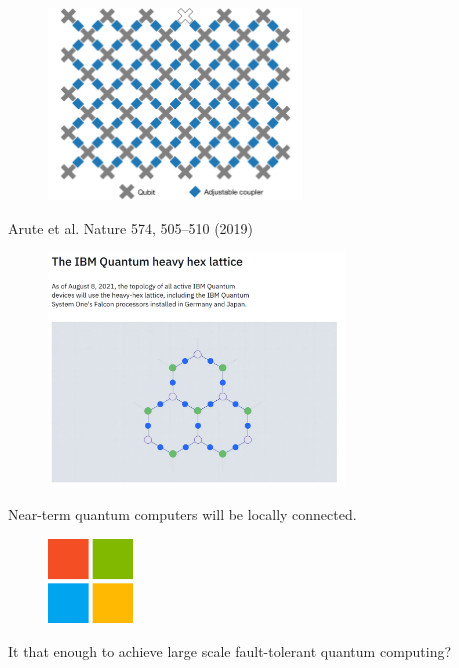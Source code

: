 \begin{frame}
  \titlepage
\end{frame}

\begin{frame}
  \centering
  \begin{figure}
    \includegraphics[width=0.6\textwidth]{figs/sycamore_precessor.png}
  \end{figure}
  {\small \color{spingrey} Arute et al. Nature 574, 505–510 (2019)}
\end{frame}

\begin{frame}
  \centering
  \begin{figure}
    \includegraphics[width=0.7\textwidth]{figs/ibm_lattice.png}
  \end{figure}
\end{frame}

\begin{frame}
  \centering
  \Huge 
  \color{spinprimary}
  Near-term quantum computers will be locally connected.
\end{frame}

\begin{frame}
  \centering
  \begin{figure}
    \includegraphics[width=0.2\textwidth]{figs/microsoft.png}
  \end{figure}
  \LARGE
  It that enough to achieve large scale fault-tolerant quantum computing?
\end{frame}

